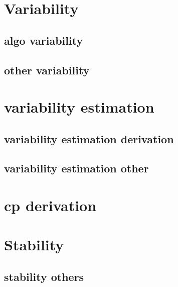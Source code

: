 \documentclass{article}
\begin{document}


\newpage
\section{Variability}

\subsection{algo variability}
\label{algo_variability}

\subsection{other variability}
\label{other_variability}


\newpage
\section{variability estimation}
\subsection{variability estimation derivation}
\label{variability_estimation}

\subsection{variability estimation other}
\label{variability_estimation_other}



\newpage
\section{cp derivation}
\label{cp_derivation}
\todo{}

\newpage
\section{Stability}
\subsection{stability others}
\label{stability_others}
\end{document}
